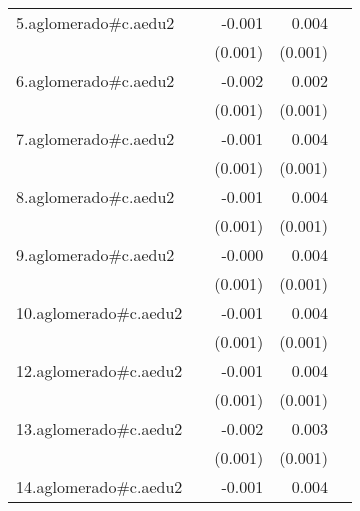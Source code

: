 {\begin{longtable}{l*{4}{D{.}{.}{-1}}}
\addlinespace
5.aglomerado#c.aedu2&                     &      -0.001         &       0.004\sym{***}&                     \\
            &                     &     (0.001)         &     (0.001)         &                     \\
\addlinespace
6.aglomerado#c.aedu2&                     &      -0.002\sym{*}  &       0.002\sym{*}  &                     \\
            &                     &     (0.001)         &     (0.001)         &                     \\
\addlinespace
7.aglomerado#c.aedu2&                     &      -0.001         &       0.004\sym{***}&                     \\
            &                     &     (0.001)         &     (0.001)         &                     \\
\addlinespace
8.aglomerado#c.aedu2&                     &      -0.001         &       0.004\sym{***}&                     \\
            &                     &     (0.001)         &     (0.001)         &                     \\
\addlinespace
9.aglomerado#c.aedu2&                     &      -0.000         &       0.004\sym{***}&                     \\
            &                     &     (0.001)         &     (0.001)         &                     \\
\addlinespace
10.aglomerado#c.aedu2&                     &      -0.001         &       0.004\sym{***}&                     \\
            &                     &     (0.001)         &     (0.001)         &                     \\
\addlinespace
12.aglomerado#c.aedu2&                     &      -0.001         &       0.004\sym{***}&                     \\
            &                     &     (0.001)         &     (0.001)         &                     \\
\addlinespace
13.aglomerado#c.aedu2&                     &      -0.002         &       0.003\sym{***}&                     \\
            &                     &     (0.001)         &     (0.001)         &                     \\
\addlinespace
14.aglomerado#c.aedu2&                     &      -0.001         &       0.004\sym{***}&                     \\

\end{longtable}}
